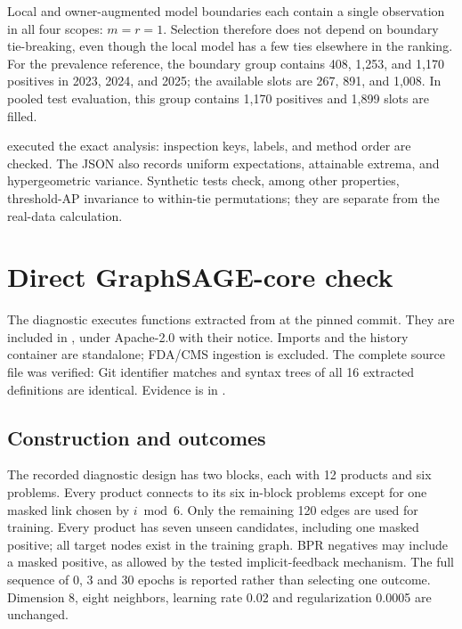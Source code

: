 Local and owner-augmented model boundaries each contain a single observation in all four scopes: $m=r=1$. Selection therefore does not depend on boundary tie-breaking, even though the local model has a few ties elsewhere in the ranking. For the prevalence reference, the boundary group contains 408, 1,253, and 1,170 positives in 2023, 2024, and 2025; the available slots are 267, 891, and 1,008. In pooled test evaluation, this group contains 1,170 positives and 1,899 slots are filled.

 executed the exact analysis: inspection keys, labels, and method order are checked. The JSON also records uniform expectations, attainable extrema, and hypergeometric variance. Synthetic tests check, among other properties, threshold-AP invariance to within-tie permutations; they are separate from the real-data calculation.

\begin{table}[!htbp]\centering\small
\caption{Observed boundaries: $m$ tied observations, $t$ positives, $r$ selected slots. $P_{\mathrm{hist}}$ is historical precision and $\mathbb{E}[P_{\text{boundary}}]$ its expectation under uniform selection restricted to the boundary group.}

\end{table}

\par{}
\section{Direct GraphSAGE-core check}
\label{supp:graphsage}
The diagnostic  executes functions extracted from  at the pinned commit\cite{hgbcode}. They are included in , under Apache-2.0 with their notice. Imports and the history container are standalone; FDA/CMS ingestion is excluded. The complete source file was verified: Git identifier  matches and syntax trees of all 16 extracted definitions are identical. Evidence is in .

\subsection{Construction and outcomes}
The recorded diagnostic design has two blocks, each with 12 products and six problems. Every product connects to its six in-block problems except for one masked link chosen by $i\bmod6$. Only the remaining 120 edges are used for training. Every product has seven unseen candidates, including one masked positive; all target nodes exist in the training graph. BPR negatives may include a masked positive, as allowed by the tested implicit-feedback mechanism. The full sequence of 0, 3 and 30 epochs is reported rather than selecting one outcome. Dimension 8, eight neighbors, learning rate 0.02 and regularization 0.0005 are unchanged.


